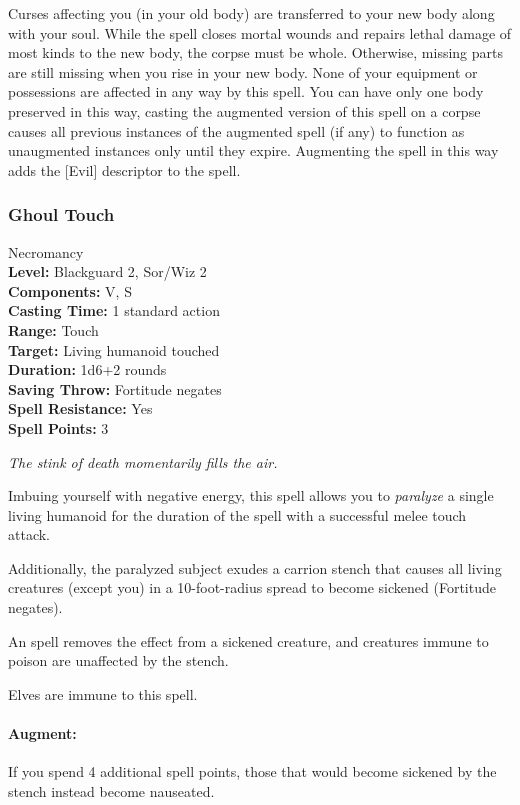 Curses affecting you (in your old body) are transferred to your new body along with your soul.
While the spell closes mortal wounds and repairs lethal damage of most kinds to the new body, the corpse must be whole. 
Otherwise, missing parts are still missing when you rise in your new body. 
None of your equipment or possessions are affected in any way by this spell.
You can have only one body preserved in this way, casting the augmented version of this spell on a corpse causes all previous instances of the augmented spell (if any) to function as unaugmented instances only until they expire.
Augmenting the spell in this way adds the [Evil] descriptor to the spell.

\subsubsection{Ghoul Touch}
\label{Spell:GhoulTouch}
Necromancy
\\ \textbf{Level:} Blackguard 2, Sor/Wiz 2
\\ \textbf{Components:} V, S
\\ \textbf{Casting Time:} 1 standard action
\\ \textbf{Range:} Touch
\\ \textbf{Target:} Living humanoid touched
\\ \textbf{Duration:} 1d6+2 rounds
\\ \textbf{Saving Throw:} Fortitude negates
\\ \textbf{Spell Resistance:} Yes
\\ \textbf{Spell Points:} 3

\emph{The stink of death momentarily fills the air.}

Imbuing yourself with negative energy, this spell allows you to \emph{paralyze} a single living humanoid for the duration of the spell with a successful melee touch attack.

Additionally, the paralyzed subject exudes a carrion stench that causes all living creatures (except you) in a 10-foot-radius spread to become sickened (Fortitude negates). 

An  spell removes the effect from a sickened creature, and creatures immune to poison are unaffected by the stench.

Elves are immune to this spell.

\paragraph{Augment:} If you spend 4 additional spell points, those that would become sickened by the stench instead become nauseated.

